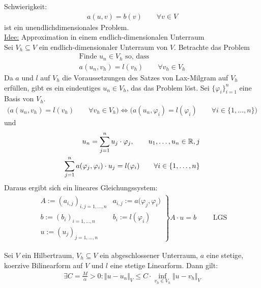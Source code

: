 Schwierigkeit:
\begin{align*}
	a(u,v)=b(v)\qquad\forall v\in V
\end{align*}
ist ein unendlichdimensionales Problem.\\
\underline{Idee:} Approximation in einem endlich-dimensionalen Unterraum\\
Sei $V_h\subseteq V$ ein endlich-dimensionaler Unterraum von $V$. 
Betrachte das Problem
\begin{align*}
	\text{Finde }u_n\in V_h \text{ so, dass }\qquad \\
	a(u_n,v_h)=l(v_h)\qquad\forall v_h\in V_h
\end{align*}
Da $a$ und $l$ auf $V_h$ die Voraussetzungen des Satzes von Lax-Milgram auf $V_h$ erfüllen, gibt es ein eindeutiges $u_n\in V_h$, das das Problem löst.\nl
Sei $\lbrace\varphi_i\rbrace_{i=1}^n$ eine Basis von $V_h$.
\begin{align*}
	\Big(a(u_n,v_h)=l(v_h)\qquad\forall v_h\in V_h\Big)\Longleftrightarrow
	\Big(a(u_n,\varphi_i)=l(\varphi_i)\qquad\forall i\in\lbrace1,\ldots,n\rbrace\Big)
\end{align*}
und 
\begin{align*}
	u_n=\sum\limits_{j=1}^n u_j\cdot\varphi_j,\qquad u_1,\ldots,u_n\in\mathbb{R},j\\
	\sum\limits_{j=1}^n a(\varphi_j,\varphi_i)\cdot u_j=l(\varphi_i)\qquad\forall i\in\lbrace1,\ldots,n\rbrace\\
\end{align*}
Daraus ergibt sich ein lineares Gleichungssystem:
\begin{align*}
	\left.\begin{array}{ll}
		A:=(a_{i,j})_{i,j=1,\ldots,n} &a_{i,j}:=a\big(\varphi_j,\varphi_i\big)\\
		b:=(b_i)_{i=1,\ldots,n} &b_i:=l(\varphi_i)\\
		u:=(u_j)_{j=1,\ldots,n}
	\end{array}\right\rbrace A\cdot u=b\qquad\text{ LGS}
\end{align*}

\begin{theorem}\enter\label{theorem2.2CeasLemma}
	Sei $V$ ein Hilbertraum, $V_h\subseteq V$ ein abgeschlossener Unterraum, $a$ eine stetige, koerzive Bilinearform auf $V$ und $l$ eine stetige Linearform. 
	Dann gilt:
	\begin{align*}
		\exists C=\frac{M}{\alpha}>0:\Vert u-u_n\Vert_V\leq C\cdot\inf\limits_{v_h\in V_h}\Vert u-v_h\Vert_V
	\end{align*}
\end{theorem}

